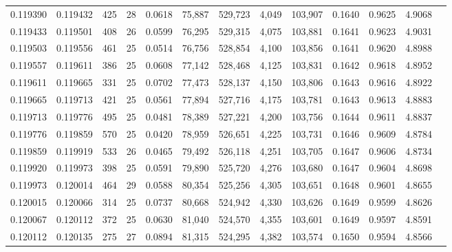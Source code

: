 \begin{tabular}{rrrrrrrrrrrrr}
0.119390 & 0.119432 & 425 &  28 &                                     0.0618 &  75,887 & 529,723 &   4,049 & 103,907 & 0.1640 & 0.9625 & 4.9068 \\
0.119433 & 0.119501 & 408 &  26 &                                     0.0599 &  76,295 & 529,315 &   4,075 & 103,881 & 0.1641 & 0.9623 & 4.9031 \\
0.119503 & 0.119556 & 461 &  25 &                                     0.0514 &  76,756 & 528,854 &   4,100 & 103,856 & 0.1641 & 0.9620 & 4.8988 \\
0.119557 & 0.119611 & 386 &  25 &                                     0.0608 &  77,142 & 528,468 &   4,125 & 103,831 & 0.1642 & 0.9618 & 4.8952 \\
0.119611 & 0.119665 & 331 &  25 &                                     0.0702 &  77,473 & 528,137 &   4,150 & 103,806 & 0.1643 & 0.9616 & 4.8922 \\
0.119665 & 0.119713 & 421 &  25 &                                     0.0561 &  77,894 & 527,716 &   4,175 & 103,781 & 0.1643 & 0.9613 & 4.8883 \\
0.119713 & 0.119776 & 495 &  25 &                                     0.0481 &  78,389 & 527,221 &   4,200 & 103,756 & 0.1644 & 0.9611 & 4.8837 \\
0.119776 & 0.119859 & 570 &  25 &                                     0.0420 &  78,959 & 526,651 &   4,225 & 103,731 & 0.1646 & 0.9609 & 4.8784 \\
0.119859 & 0.119919 & 533 &  26 &                                     0.0465 &  79,492 & 526,118 &   4,251 & 103,705 & 0.1647 & 0.9606 & 4.8734 \\
0.119920 & 0.119973 & 398 &  25 &                                     0.0591 &  79,890 & 525,720 &   4,276 & 103,680 & 0.1647 & 0.9604 & 4.8698 \\
0.119973 & 0.120014 & 464 &  29 &                                     0.0588 &  80,354 & 525,256 &   4,305 & 103,651 & 0.1648 & 0.9601 & 4.8655 \\
0.120015 & 0.120066 & 314 &  25 &                                     0.0737 &  80,668 & 524,942 &   4,330 & 103,626 & 0.1649 & 0.9599 & 4.8626 \\
0.120067 & 0.120112 & 372 &  25 &                                     0.0630 &  81,040 & 524,570 &   4,355 & 103,601 & 0.1649 & 0.9597 & 4.8591 \\
0.120112 & 0.120135 & 275 &  27 &                                     0.0894 &  81,315 & 524,295 &   4,382 & 103,574 & 0.1650 & 0.9594 & 4.8566 \\

\end{tabular}
